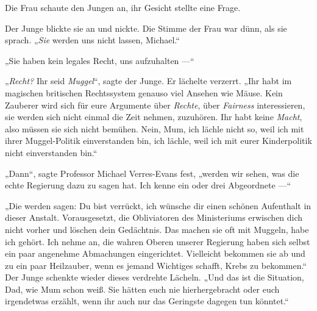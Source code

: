 Die Frau schaute den Jungen an, ihr Gesicht stellte eine Frage.

Der Junge blickte sie an und nickte. Die Stimme der Frau war dünn, als sie sprach.
„\emph{Sie} werden uns nicht lassen, Michael.“

„Sie haben kein legales Recht, uns aufzuhalten —“

„\emph{Recht?} Ihr seid \emph{Muggel}“, sagte der Junge. Er lächelte verzerrt.
„Ihr habt im magischen britischen Rechtssystem genauso viel Ansehen wie Mäuse. Kein Zauberer wird sich für eure Argumente über \emph{Rechte}, über \emph{Fairness} interessieren, sie werden sich nicht einmal die Zeit nehmen, zuzuhören. Ihr habt keine \emph{Macht}, also müssen sie sich nicht bemühen. Nein, Mum, ich lächle nicht so, weil ich mit ihrer Muggel-Politik einverstanden bin, ich lächle, weil ich mit eurer Kinderpolitik nicht einverstanden bin.“

„Dann“, sagte Professor Michael Verres-Evans fest, „werden wir sehen, was die echte Regierung dazu zu sagen hat. Ich kenne ein oder drei Abgeordnete —“

„Die werden sagen: Du bist verrückt, ich wünsche dir einen schönen Aufenthalt in dieser Anstalt. Vorausgesetzt, die Obliviatoren des Ministeriums erwischen dich nicht vorher und löschen dein Gedächtnis. Das machen sie oft mit Muggeln, habe ich gehört. Ich nehme an, die wahren Oberen unserer Regierung haben sich selbst ein paar angenehme Abmachungen eingerichtet. Vielleicht bekommen sie ab und zu ein paar Heilzauber, wenn es jemand Wichtiges schafft, Krebs zu bekommen.“ Der Junge schenkte wieder dieses verdrehte Lächeln.
„Und das ist die Situation, Dad, wie Mum schon weiß. Sie hätten euch nie hierhergebracht oder euch irgendetwas erzählt, wenn ihr auch nur das Geringste dagegen tun könntet.“

